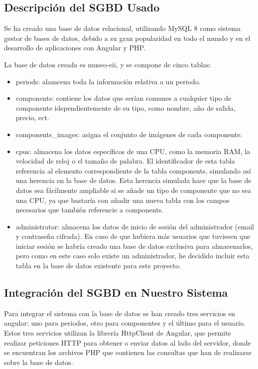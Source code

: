 \subsection{Descripción del SGBD Usado} 
Se ha creado una base de datos relacional, utilizando MySQL 8 como sistema gestor de bases de datos, debido a su gran popularidad en todo el mundo y en el desarrollo de aplicaciones con Angular y PHP.
\par La base de datos creada es museo-eii, y se compone de cinco tablas: 
\begin{itemize}
	\item periods: alamcena toda la información relativa a un periodo.
	\item components: contiene los datos que serían comunes a cualquier tipo de componente idependientemente de su tipo, como nombre, año de salida, precio, ect.
	\item components\_images: asigna el conjunto de imágenes de cada componente.
	\item cpus: almacena los datos específicos de una CPU, como la memoria RAM, la velocidad de reloj o el tamaño de palabra. El identificador de esta tabla referencia al elemento correspondiente de la tabla components, simulando así una herencia en la base de datos. Esta herencia simulada hace que la base de datos sea fácilmente ampliable si se añade un tipo de componente que no sea una CPU, ya que bastaría con añadir una nueva tabla con los campos necesarios que también referencie a components.
	\item administrator: almacena los datos de inicio de sesión del administrador (email y contraseña cifrada). En caso de que hubiera más usuarios que tuviesen que iniciar sesión se habría creado una base de datos exclusiva para almacenarlos, pero como en este caso solo existe un administrador, he decidido incluir esta tabla en la base de datos existente para este proyecto.
\end{itemize}
\subsection{Integración del SGBD en Nuestro Sistema} 
Para integrar el sistema con la base de datos se han creado tres servicios en angular: uno para periodos, otro para componentes y el último para el usuario. Estos tres servicios utilizan la librería HttpClient de Angular, que permite realizar peticiones HTTP para obtener o enviar datos al lado del servidor, donde se encuentran los archivos PHP que contienen las consultas que han de realizarse sobre la base de datos.
